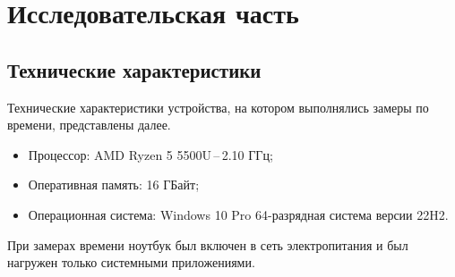 \chapter{Исследовательская часть}

\section{Технические характеристики}
Технические характеристики устройства, на котором выполнялись замеры по времени, представлены далее.
\begin{itemize}
	\item Процессор: AMD Ryzen 5 5500U\,--\,2.10 ГГц;
	\item Оперативная память: 16 ГБайт;
	\item Операционная система: Windows 10 Pro 64-разрядная система версии 22H2.
\end{itemize}

При замерах времени ноутбук был включен в сеть электропитания и был нагружен только системными приложениями.

